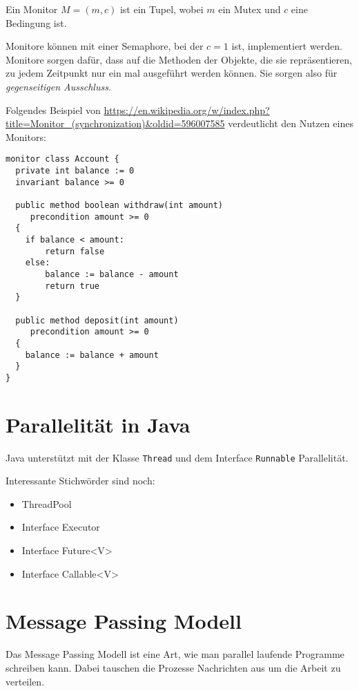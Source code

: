 \begin{definition}[Monitor]%
    Ein Monitor $M = (m, c)$ ist ein Tupel, wobei $m$ ein Mutex und $c$ eine 
    Bedingung ist.
\end{definition}

Monitore können mit einer Semaphore, bei der $c=1$ ist, implementiert werden. 
Monitore sorgen dafür, dass auf die Methoden der Objekte, die sie repräsentieren, 
zu jedem Zeitpunkt nur ein mal ausgeführt werden können. Sie sorgen also für
\textit{gegenseitigen Ausschluss}.

\begin{beispiel}[Monitor]
    Folgendes Beispiel von \url{https://en.wikipedia.org/w/index.php?title=Monitor_(synchronization)&oldid=596007585} verdeutlicht den Nutzen eines Monitors:

\begin{verbatim}
monitor class Account {
  private int balance := 0
  invariant balance >= 0

  public method boolean withdraw(int amount)
     precondition amount >= 0
  {
    if balance < amount:
        return false
    else:
        balance := balance - amount
        return true
  }

  public method deposit(int amount)
     precondition amount >= 0
  {
    balance := balance + amount
  }
}
\end{verbatim}
\end{beispiel}

\section{Parallelität in Java}
Java unterstützt mit der Klasse \texttt{Thread} und dem Interface \texttt{Runnable}
Parallelität.

Interessante Stichwörder sind noch:
\begin{itemize}
    \item ThreadPool
    \item Interface Executor
    \item Interface Future<V>
    \item Interface Callable<V>
\end{itemize}

\section{Message Passing Modell}
Das Message Passing Modell ist eine Art, wie man parallel laufende Programme 
schreiben kann. Dabei tauschen die Prozesse Nachrichten aus um die Arbeit zu
verteilen.

